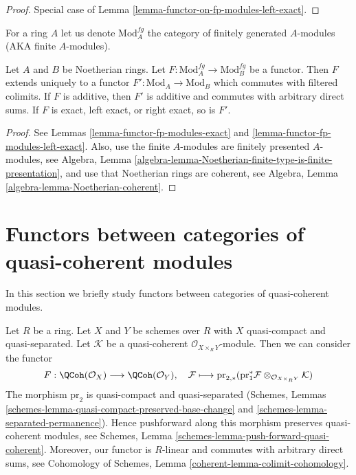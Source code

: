 \begin{proof}
Special case of Lemma \ref{lemma-functor-on-fp-modules-left-exact}.
\end{proof}

\noindent
For a ring $A$ let us denote $\text{Mod}^{fg}_A$ the category of
finitely generated $A$-modules (AKA finite $A$-modules).

\begin{lemma}
\label{lemma-functor-finite-modules}
Let $A$ and $B$ be Noetherian rings. Let
$F : \text{Mod}^{fg}_A \to \text{Mod}^{fg}_B$ be a functor.
Then $F$ extends uniquely to a functor $F' : \text{Mod}_A \to \text{Mod}_B$
which commutes with filtered colimits. If $F$ is additive, then
$F'$ is additive and commutes with arbitrary direct sums.
If $F$ is exact, left exact, or right exact, so is $F'$.
\end{lemma}

\begin{proof}
See Lemmas \ref{lemma-functor-fp-modules-exact} and
\ref{lemma-functor-fp-modules-left-exact}.
Also, use the finite $A$-modules are finitely presented $A$-modules,
see Algebra, Lemma
\ref{algebra-lemma-Noetherian-finite-type-is-finite-presentation},
and use that Noetherian rings are coherent, see
Algebra, Lemma \ref{algebra-lemma-Noetherian-coherent}.
\end{proof}









\section{Functors between categories of quasi-coherent modules}
\label{section-functor-quasi-coherent}

\noindent
In this section we briefly study functors between categories of
quasi-coherent modules.

\begin{example}
\label{example-functor-quasi-coherent}
Let $R$ be a ring. Let $X$ and $Y$ be
schemes over $R$ with $X$ quasi-compact and quasi-separated.
Let $\mathcal{K}$ be a quasi-coherent $\mathcal{O}_{X \times_R Y}$-module.
Then we can consider the functor
\begin{equation}
\label{equation-FM-QCoh}
F : \QCoh(\mathcal{O}_X) \longrightarrow \QCoh(\mathcal{O}_Y),\quad
\mathcal{F} \longmapsto
\text{pr}_{2, *}(\text{pr}_1^*\mathcal{F}
\otimes_{\mathcal{O}_{X \times_R Y}} \mathcal{K})
\end{equation}
The morphism $\text{pr}_2$ is quasi-compact and quasi-separated
(Schemes, Lemmas \ref{schemes-lemma-quasi-compact-preserved-base-change}
and \ref{schemes-lemma-separated-permanence}). Hence pushforward along
this morphism preserves quasi-coherent modules, see
Schemes, Lemma \ref{schemes-lemma-push-forward-quasi-coherent}.
Moreover, our functor is $R$-linear and commutes with arbitrary direct sums,
see Cohomology of Schemes, Lemma \ref{coherent-lemma-colimit-cohomology}.
\end{example}

